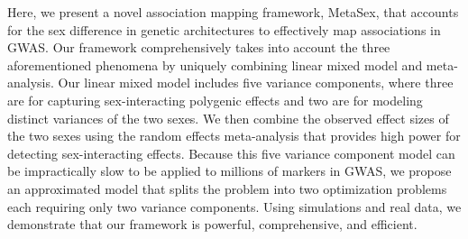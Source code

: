 \documentclass[11pt]{article}
\begin{document}
Here, we present a novel association mapping framework, MetaSex, 
that accounts for the sex difference in genetic architectures
to effectively map associations in GWAS.
Our framework  comprehensively takes into account the three aforementioned phenomena
by
uniquely combining linear mixed model and meta-analysis.
Our linear mixed model includes five variance components, 
where three are for capturing sex-interacting polygenic effects
and two are for modeling distinct variances of the two sexes. 
We then combine the observed effect sizes of the two sexes 
using the random effects meta-analysis \citep{Han:AmJHumGenet:2011} 
that provides high power for detecting sex-interacting effects.
Because this five variance component model can be
impractically slow to be applied to millions of markers in GWAS,
we propose an approximated model that splits the problem into two optimization problems each requiring only two variance components.
Using simulations and real data,
we demonstrate that our framework is powerful, comprehensive, and efficient.

\end{document}

